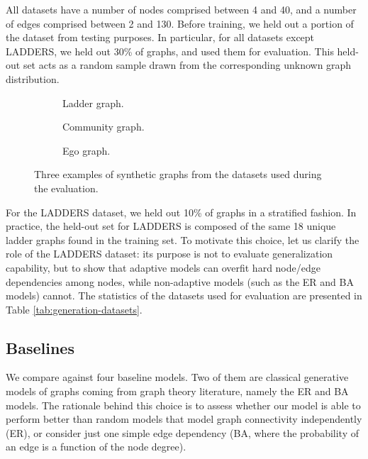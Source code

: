All datasets have a number of nodes comprised between 4 and 40, and a number of edges comprised between 2 and 130. Before training, we held out a portion of the dataset from testing purposes. In particular, for all datasets except LADDERS, we held out 30\% of graphs, and used them for evaluation. This held-out set acts as a random sample drawn from the corresponding unknown graph distribution.
\begin{figure}[h!]
    \begin{subfigure}[b]{0.25\linewidth}
        \centering
        \resizebox{.55\textwidth}{!}{}
        \caption{Ladder graph.}
        \label{fig:ladder}
    \end{subfigure}
    \begin{subfigure}[b]{0.43\linewidth}
        \centering
        \resizebox{.8\textwidth}{!}{}
        \caption{Community graph.}
        \label{fig:community}
    \end{subfigure}
    \begin{subfigure}[b]{0.30\linewidth}
        \centering
        \resizebox{.8\textwidth}{!}{}
        \caption{Ego graph.}
        \label{fig:ego}
    \end{subfigure}
    \caption{Three examples of synthetic graphs from the datasets used during the evaluation.}
    \label{fig:synthetic-graphs}
\end{figure}
For the LADDERS dataset, we held out 10\% of graphs in a stratified fashion. In practice, the held-out set for LADDERS is composed of the same 18 unique ladder graphs found in the training set. To motivate this choice, let us clarify the role of the LADDERS dataset: its purpose is not to evaluate generalization capability, but to show that adaptive models can overfit hard node/edge dependencies among nodes, while non-adaptive models (such as the ER and BA models) cannot. The statistics of the datasets used for evaluation are presented in Table \ref{tab:generation-datasets}.



\subsection{Baselines}
We compare against four baseline models. Two of them are classical generative models of graphs coming from graph theory literature, namely the ER and BA models. The rationale behind this choice is to assess whether our model is able to perform better than random models that model graph connectivity independently (ER), or consider just one simple edge dependency (BA, where the probability of an edge is a function of the node degree).

